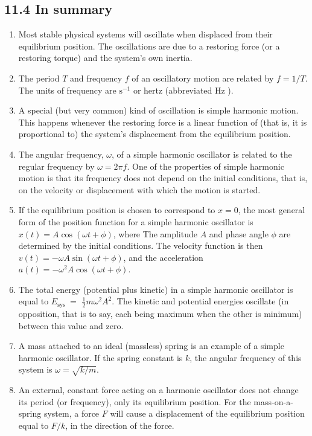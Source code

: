 \documentclass[10pt]{article}
\begin{document}
\subsection*{11.4 In summary}
\begin{enumerate}
  \item Most stable physical systems will oscillate when displaced from their equilibrium position. The oscillations are due to a restoring force (or a restoring torque) and the system's own inertia.
  \item The period $T$ and frequency $f$ of an oscillatory motion are related by $f=1 / T$. The units of frequency are $\mathrm{s}^{-1}$ or hertz (abbreviated Hz ).
  \item A special (but very common) kind of oscillation is simple harmonic motion. This happens whenever the restoring force is a linear function of (that is, it is proportional to) the system's displacement from the equilibrium position.
  \item The angular frequency, $\omega$, of a simple harmonic oscillator is related to the regular frequency by $\omega=2 \pi f$. One of the properties of simple harmonic motion is that its frequency does not depend on the initial conditions, that is, on the velocity or displacement with which the motion is started.
  \item If the equilibrium position is chosen to correspond to $x=0$, the most general form of the position function for a simple harmonic oscillator is $x(t)=A \cos (\omega t+\phi)$, where The amplitude $A$ and phase angle $\phi$ are determined by the initial conditions. The velocity function is then $v(t)=-\omega A \sin (\omega t+\phi)$, and the acceleration $a(t)=-\omega^{2} A \cos (\omega t+\phi)$.
  \item The total energy (potential plus kinetic) in a simple harmonic oscillator is equal to $E_{\text {sys }}=$ $\frac{1}{2} m \omega^{2} A^{2}$. The kinetic and potential energies oscillate (in opposition, that is to say, each being maximum when the other is minimum) between this value and zero.
  \item A mass attached to an ideal (massless) spring is an example of a simple harmonic oscillator. If the spring constant is $k$, the angular frequency of this system is $\omega=\sqrt{k / m}$.
  \item An external, constant force acting on a harmonic oscillator does not change its period (or frequency), only its equilibrium position. For the mass-on-a-spring system, a force $F$ will cause a displacement of the equilibrium position equal to $F / k$, in the direction of the force.

\end{enumerate}
\end{document}
